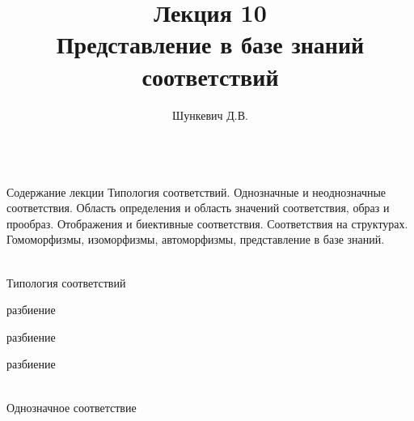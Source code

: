 
\title{Лекция 10\\Представление в базе знаний соответствий}
\author[]{Шункевич Д.В.}

\begin{frame}
	\titlepage
\end{frame}

\begin{frame}{\\Содержание лекции}
	\topline
	\justifying
	Типология соответствий. Однозначные и неоднозначные соответствия. Область определения и область значений соответствия, образ и прообраз. Отображения и биективные соответствия. Соответствия на структурах. Гомоморфизмы, изоморфизмы, автоморфизмы, представление в базе знаний.
\end{frame}

\begin{frame}{\\Типология соответствий}
\topline
\begin{SCn}
\begin{scnrelfromset}{разбиение}
\end{scnrelfromset}
\begin{scnrelfromset}{разбиение}
\end{scnrelfromset}
\begin{scnrelfromset}{разбиение}
\end{scnrelfromset}
\end{SCn}
\end{frame}

\begin{frame}{\\Однозначное соответствие}
\topline
\begin{SCn}
\end{SCn}
\end{frame}

